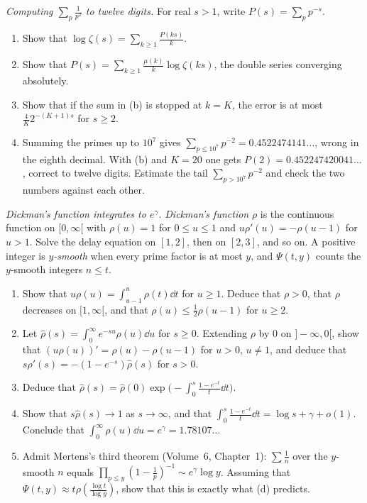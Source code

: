 \begin{exercise}[$\star\star$]\label{pb:primezeta}
\emph{Computing $\sum_p\frac1{p^2}$ to twelve digits.} For real $s>1$, write $P(s)=\sum_pp^{-s}$.
\begin{enumerate}[label=(\alph*)]
\item Show that $\log\zeta(s)=\sum_{k\ge1}\frac{P(ks)}k$.
\item Show that $P(s)=\sum_{k\ge1}\frac{\mu(k)}k\log\zeta(ks)$, the double series converging absolutely.
\item Show that if the sum in (b) is stopped at $k=K$, the error is at most $\frac{4}{K}2^{-(K+1)s}$ for $s\ge2$.
\item Summing the primes up to $10^7$ gives $\sum_{p\le10^7}p^{-2}=0.4522474141\ldots$, wrong in the eighth decimal. With (b) and $K=20$ one gets
$P(2)=0.452247420041\ldots$, correct to twelve digits. Estimate the tail $\sum_{p>10^7}p^{-2}$ and check the two numbers against each other.
\end{enumerate}
\end{exercise}

\begin{exercise}[$\star\star\star$]\label{pb:dickmanint}
\emph{Dickman's function integrates to $e^\gamma$.} \emph{Dickman's function} $\rho$ is the continuous function on $[0,\infty[$ with $\rho(u)=1$ for $0\le u\le1$ and $u\rho'(u)=-\rho(u-1)$ for $u>1$. Solve the delay equation on $[1,2]$, then on $[2,3]$, and so on. A positive integer is \emph{$y$-smooth} when every prime factor is at most $y$, and $\Psi(t,y)$ counts the $y$-smooth integers $n\le t$.
\begin{enumerate}[label=(\alph*)]
\item Show that $u\rho(u)=\int_{u-1}^u\rho(t)\dd t$ for $u\ge1$. Deduce that $\rho>0$, that $\rho$ decreases on $[1,\infty[$, and that $\rho(u)\le\frac12\rho(u-1)$ for $u\ge2$.
\item Let $\hat\rho(s)=\int_0^\infty e^{-su}\rho(u)\dd u$ for $s\ge0$. Extending $\rho$ by $0$ on $]-\infty,0[$, show that $(u\rho(u))'=\rho(u)-\rho(u-1)$ for $u>0$, $u\ne1$, and deduce
that $s\hat\rho'(s)=-(1-e^{-s})\hat\rho(s)$ for $s>0$.
\item Deduce that $\hat\rho(s)=\hat\rho(0)\exp\bigl(-\int_0^s\frac{1-e^{-t}}t\dd t\bigr)$.
\item Show that $s\hat\rho(s)\to1$ as $s\to\infty$, and that $\int_0^s\frac{1-e^{-t}}t\dd t=\log s+\gamma+o(1)$. Conclude that $\int_0^\infty\rho(u)\dd u=e^\gamma=1.78107\ldots$
\item Admit Mertens's third theorem (Volume~6, Chapter~1): $\sum\frac1n$ over the $y$-smooth $n$ equals $\prod_{p\le y}(1-\frac1p)^{-1}\sim e^\gamma\log y$. Assuming that $\Psi(t,y)\approx t\rho(\frac{\log t}{\log y})$,
show that this is exactly what (d) predicts.
\end{enumerate}
\end{exercise}

